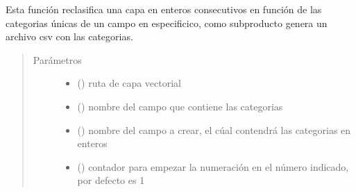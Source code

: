 \documentclass[letterpaper,10pt,spanish]{sphinxmanual}
\begin{document}
\begin{fulllineitems}
\label{\detokenize{apcsig:apcsig.agregar_categorias}}
Esta función reclasifica una capa en enteros consecutivos en función de las categorias únicas de un 
campo en especificico, como subproducto genera un archivo csv con las categorias.
\begin{quote}\begin{description}
\item[{Parámetros}] \leavevmode\begin{itemize}
\item {} 
 () \textendash{} ruta de capa vectorial

\item {} 
 () \textendash{} nombre del campo que contiene las categorias

\item {} 
 () \textendash{} nombre del campo a crear, el cúal contendrá las categorias en enteros

\item {} 
 () \textendash{} contador para empezar la numeración en el número indicado, por defecto es 1

\end{itemize}

\end{description}\end{quote}

\end{fulllineitems}

\end{document}
